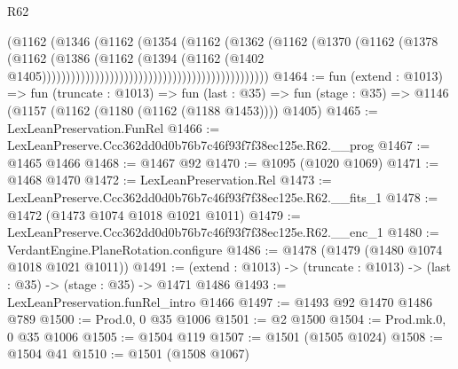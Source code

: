 \begin{lexlean}{R62}
\begin{coremodule}
                                                                  (@1162
                                                                    (@1346
                                                                      (@1162
                                                                        (@1354
                                                                          (@1162
                                                                            (@1362
                                                                              (@1162
                                                                                (@1370
                                                                                  (@1162
                                                                                    (@1378
                                                                                      (@1162
                                                                                        (@1386
                                                                                          (@1162
                                                                                            (@1394
                                                                                              (@1162
                                                                                                (@1402
                                                                                                  @1405)))))))))))))))))))))))))))))))))))))))))))))))
@1464 := fun (extend : @1013) =>
  fun (truncate : @1013) =>
  fun (last : @35) => fun (stage : @35) => @1146 (@1157 (@1162 (@1180 (@1162 (@1188 @1453)))) @1405)
@1465 := LexLeanPreservation.FunRel
@1466 := LexLeanPreserve.Ccc362dd0d0b76b7c46f93f7f38ec125e.R62.__prog
@1467 := @1465 @1466
@1468 := @1467 @92
@1470 := @1095 (@1020 @1069)
@1471 := @1468 @1470
@1472 := LexLeanPreservation.Rel
@1473 := LexLeanPreserve.Ccc362dd0d0b76b7c46f93f7f38ec125e.R62.__fits_1
@1478 := @1472 (@1473 @1074 @1018 @1021 @1011)
@1479 := LexLeanPreserve.Ccc362dd0d0b76b7c46f93f7f38ec125e.R62.__enc_1
@1480 := VerdantEngine.PlaneRotation.configure
@1486 := @1478 (@1479 (@1480 @1074 @1018 @1021 @1011))
@1491 := (extend : @1013) -> (truncate : @1013) -> (last : @35) -> (stage : @35) -> @1471 @1486
@1493 := LexLeanPreservation.funRel_intro @1466
@1497 := @1493 @92 @1470 @1486 @789
@1500 := Prod.{0, 0} @35 @1006
@1501 := @2 @1500
@1504 := Prod.mk.{0, 0} @35 @1006
@1505 := @1504 @119
@1507 := @1501 (@1505 @1024)
@1508 := @1504 @41
@1510 := @1501 (@1508 @1067)

\end{coremodule}
\end{lexlean}
